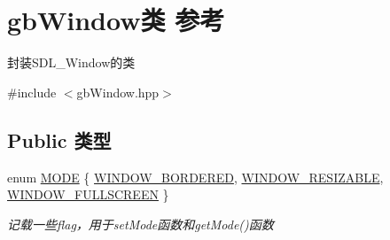 \hypertarget{classgb_window}{}\section{gb\+Window类 参考}
\label{classgb_window}


封装\+S\+D\+L\+\_\+\+Window的类  




{\ttfamily \#include $<$gb\+Window.\+hpp$>$}

\subsection*{Public 类型}
\begin{DoxyCompactItemize}
\item 
enum \mbox{\hyperlink{classgb_window_a19e70d277e17598ddb3c229e28dbb9e9}{M\+O\+DE}} \{ \mbox{\hyperlink{classgb_window_a19e70d277e17598ddb3c229e28dbb9e9a5740824054b0e553087697d3bd125fe8}{W\+I\+N\+D\+O\+W\+\_\+\+B\+O\+R\+D\+E\+R\+ED}}, 
\mbox{\hyperlink{classgb_window_a19e70d277e17598ddb3c229e28dbb9e9abd206e493c11e82b172da8577883cc82}{W\+I\+N\+D\+O\+W\+\_\+\+R\+E\+S\+I\+Z\+A\+B\+LE}}, 
\mbox{\hyperlink{classgb_window_a19e70d277e17598ddb3c229e28dbb9e9a0d12505e22d971c669ff572a2e618f55}{W\+I\+N\+D\+O\+W\+\_\+\+F\+U\+L\+L\+S\+C\+R\+E\+EN}}
 \}
\begin{DoxyCompactList}\small\item\em 记载一些flag，用于set\+Mode函数和get\+Mode()函数 \end{DoxyCompactList}\end{DoxyCompactItemize}
